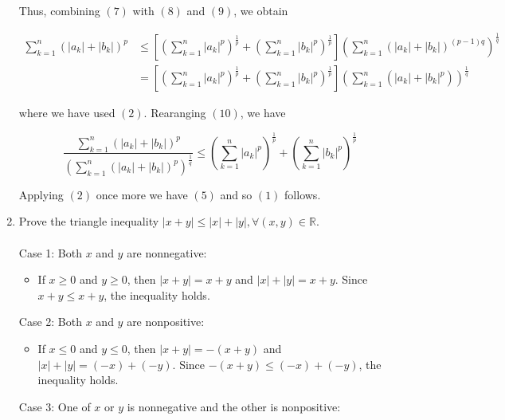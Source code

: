 \documentclass{article}
\begin{document}
\begin{enumerate}
	      Thus, combining $(7)$ with $(8)$ and $(9)$, we obtain

	      \begin{equation}
		      \begin{split}
			      \sum_{k=1}^{n}(|a_k| + |b_k|)^p & \leq \left[\left(\sum_{k=1}^{n}|a_k|^p\right)^\frac{1}{p} + \left(\sum_{k=1}^{n}|b_k|^p\right)^\frac{1}{p}\right] \left(\sum_{k=1}^{n}(|a_k| + |b_k|)^{(p-1)q}\right)^\frac{1}{q} \\
			                                      & = \left[\left(\sum_{k=1}^{n}|a_k|^p\right)^\frac{1}{p} + \left(\sum_{k=1}^{n}|b_k|^p\right)^\frac{1}{p}\right] \left(\sum_{k=1}^{n}(|a_k| + |b_k|^p)\right)^\frac{1}{q}
		      \end{split}
	      \end{equation}

	      where we have used $(2)$. Rearanging $(10)$, we have

	      \begin{equation}
		      \frac{\sum_{k=1}^{n}(|a_k| + |b_k|)^p}{(\sum_{k=1}^{n}(|a_k| + |b_k|)^p)^\frac{1}{q}} \leq \left(\sum_{k=1}^{n}|a_k|^p\right)^\frac{1}{p} + \left(\sum_{k=1}^{n}|b_k|^p\right)^\frac{1}{p}
	      \end{equation}

	      Applying $(2)$ once more we have $(5)$ and so $(1)$ follows.


	\item Prove the triangle inequality $|x  +y| \leq |x| + |y|, \forall(x,y) \in \mathbb{R}$.
	      \\~\\
	      Case 1: Both $x$ and $y$ are nonnegative:

	      \begin{itemize}
		      \item If $x \geq 0$ and $y \geq 0$, then $|x + y| = x + y$ and $|x| + |y| = x + y$. Since $x + y \leq x + y$, the inequality holds.
	      \end{itemize}

	      Case 2: Both $x$ and $y$ are nonpositive:

	      \begin{itemize}
		      \item If $x \leq 0$ and $y \leq 0$, then $|x + y| = -(x + y)$ and $|x| + |y| = (-x) + (-y).$ Since $-(x + y) \leq (-x) + (-y)$, the inequality holds.
	      \end{itemize}

	      Case 3: One of $x$ or $y$ is nonnegative and the other is nonpositive:


\end{enumerate}
\end{document}
